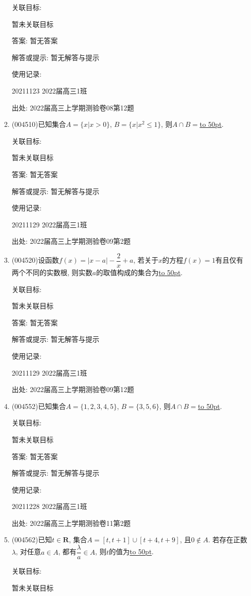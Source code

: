 \documentclass[10pt,a4paper]{article}
\newcommand{\blank}[1]{\underline{\hbox to #1pt{}}}
\begin{document}
\begin{enumerate}[1.]
关联目标:

暂未关联目标

答案: 暂无答案

解答或提示: 暂无解答与提示

使用记录:

20211123	2022届高三1班	


出处: 2022届高三上学期测验卷08第12题
\item { (004510)}已知集合$A=\{x|x>0\}$, $B=\{x|x^2\le 1\}$, 则$A\cap B=$\blank{50}.


关联目标:

暂未关联目标

答案: 暂无答案

解答或提示: 暂无解答与提示

使用记录:

20211129	2022届高三1班	


出处: 2022届高三上学期测验卷09第2题
\item { (004520)}设函数$f(x)=|x-a|-\dfrac 2x+a$, 若关于$x$的方程$f(x)=1$有且仅有两个不同的实数根, 则实数$a$的取值构成的集合为\blank{50}.


关联目标:

暂未关联目标

答案: 暂无答案

解答或提示: 暂无解答与提示

使用记录:

20211129	2022届高三1班	


出处: 2022届高三上学期测验卷09第12题
\item { (004552)}已知集合$A=\{1,2,3,4,5\}$, $B=\{3,5,6\}$, 则$A\cap B=$\blank{50}.


关联目标:

暂未关联目标

答案: 暂无答案

解答或提示: 暂无解答与提示

使用记录:

20211228	2022届高三1班	


出处: 2022届高三上学期测验卷11第2题
\item { (004562)}已知$t\in \mathbf{R}$, 集合$A=[t,t+1]\cup [t+4,t+9]$, 且$0\not\in A$. 若存在正数$\lambda$, 对任意$a\in A$, 都有$\dfrac{\lambda}a\in A$, 则$t$的值为\blank{50}.


关联目标:

暂未关联目标


\end{enumerate}
\end{document}
